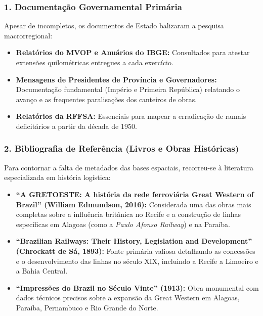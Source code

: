 \documentclass[11pt, a4paper]{article}
\begin{document}
\subsubsection*{1. Documentação Governamental Primária}
Apesar de incompletos, os documentos de Estado balizaram a pesquisa macrorregional:
\begin{itemize}
    \item \textbf{Relatórios do MVOP e Anuários do IBGE:} Consultados para atestar extensões quilométricas entregues a cada exercício.
    \item \textbf{Mensagens de Presidentes de Província e Governadores:} Documentação fundamental (Império e Primeira República) relatando o avanço e as frequentes paralisações dos canteiros de obras.
    \item \textbf{Relatórios da RFFSA:} Essenciais para mapear a erradicação de ramais deficitários a partir da década de 1950.
\end{itemize}

\subsubsection*{2. Bibliografia de Referência (Livros e Obras Históricas)}
Para contornar a falta de metadados das bases espaciais, recorreu-se à literatura especializada em história logística:
\begin{itemize}
    \item \textbf{``A GRETOESTE: A história da rede ferroviária Great Western of Brazil'' (William Edmundson, 2016):} Considerada uma das obras mais completas sobre a influência britânica no Recife e a construção de linhas específicas em Alagoas (como a \textit{Paulo Afonso Railway}) e na Paraíba.
    \item \textbf{``Brazilian Railways: Their History, Legislation and Development'' (Chrockatt de Sá, 1893):} Fonte primária valiosa detalhando as concessões e o desenvolvimento das linhas no século XIX, incluindo a Recife a Limoeiro e a Bahia Central.
    \item \textbf{``Impressões do Brazil no Século Vinte'' (1913):} Obra monumental com dados técnicos precisos sobre a expansão da Great Western em Alagoas, Paraíba, Pernambuco e Rio Grande do Norte.
\end{itemize}
\end{document}
